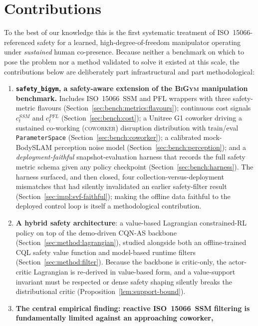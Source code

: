 \documentclass[11pt,a4paper]{report}
\newcommand{\ssm}{SSM}
\newcommand{\pfl}{PFL}
\newcommand{\iso}{ISO~15066}
\newcommand{\bigym}{\textsc{BiGym}}
\newcommand{\sbigym}{\texttt{safety\_bigym}}
\newcommand{\cqnas}{CQN-AS}
\newcommand{\coworker}{\textsc{coworker}}
\newcommand{\bodyslampp}{BodySLAM\nolinebreak[4]\hspace{-.05em}\raisebox{.2ex}{\scriptsize ++}}
\begin{document}
\section{Contributions}
\label{sec:intro:contributions}

To the best of our knowledge this is the first systematic treatment of
\iso{}-referenced safety for a learned, high-degree-of-freedom
manipulator operating under \emph{sustained} human co-presence. Because
neither a benchmark on which to pose the problem nor a method validated
to solve it existed at this scale, the contributions below are
deliberately part infrastructural and part methodological:

\begin{enumerate}[label=\textbf{C\arabic*.}, leftmargin=2em]
\item \textbf{\sbigym{}, a safety-aware extension of the \bigym{}
manipulation benchmark.} Includes \iso{}~\ssm{} and \pfl{} wrappers
with three safety-metric flavours
(Section~\ref{sec:bench:metrics:flavours}); continuous cost signals
$c^{\ssm}_t$ and $c^{\pfl}_t$ (Section~\ref{sec:bench:cost}); a
Unitree G1 coworker driving a sustained co-working (\coworker{})
disruption distribution with train/eval \texttt{ParameterSpace}
(Section~\ref{sec:bench:coworker}); a calibrated mock-\bodyslampp{}
perception noise model (Section~\ref{sec:bench:perception}); and a
\emph{deployment-faithful} snapshot-evaluation harness that records the
full safety metric schema given any policy checkpoint
(Section~\ref{sec:bench:harness}). The harness surfaced, and then
closed, four collection-versus-deployment mismatches that had silently
invalidated an earlier safety-filter result
(Section~\ref{sec:impl:svf-faithful}); making the offline data faithful
to the deployed control loop is itself a methodological contribution.
\item \textbf{A hybrid safety architecture}: a value-based Lagrangian
constrained-RL policy on top of the demo-driven \cqnas{} backbone
(Section~\ref{sec:method:lagrangian}), studied alongside both an
offline-trained \textsc{CQL} safety value function and model-based
runtime filters (Section~\ref{sec:method:filter}). Because the backbone
is critic-only, the actor-critic Lagrangian is re-derived in
value-based form, and a value-support invariant must be respected or
dense safety shaping silently breaks the distributional critic
(Proposition~\ref{lem:support-bound}).
\item \textbf{The central empirical finding: reactive \iso{}~\ssm{}
filtering is fundamentally limited against an approaching coworker,
}
\end{enumerate}
\end{document}
